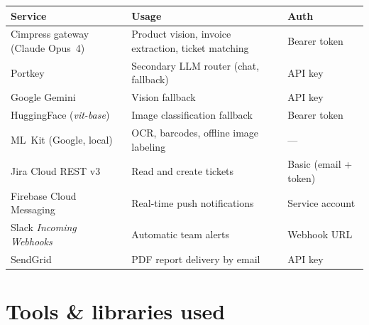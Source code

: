 \documentclass[11pt,a4paper]{article}
\begin{document}
\begin{center}
\begin{tabularx}{\linewidth}{@{}lXl@{}}
\toprule
\textbf{Service} & \textbf{Usage} & \textbf{Auth}\\
\midrule
Cimpress gateway (Claude Opus~4)  & Product vision, invoice extraction, ticket matching & Bearer token \\
Portkey                           & Secondary LLM router (chat, fallback) & API key \\
Google Gemini                     & Vision fallback & API key \\
HuggingFace (\emph{vit-base})     & Image classification fallback & Bearer token \\
ML~Kit (Google, local)            & OCR, barcodes, offline image labeling & --- \\
Jira Cloud REST v3                & Read and create tickets & Basic (email + token) \\
Firebase Cloud Messaging          & Real-time push notifications & Service account \\
Slack \emph{Incoming Webhooks}    & Automatic team alerts & Webhook URL \\
SendGrid                          & PDF report delivery by email & API key \\
\bottomrule
\end{tabularx}
\end{center}

\section{Tools \& libraries used}
\end{document}
